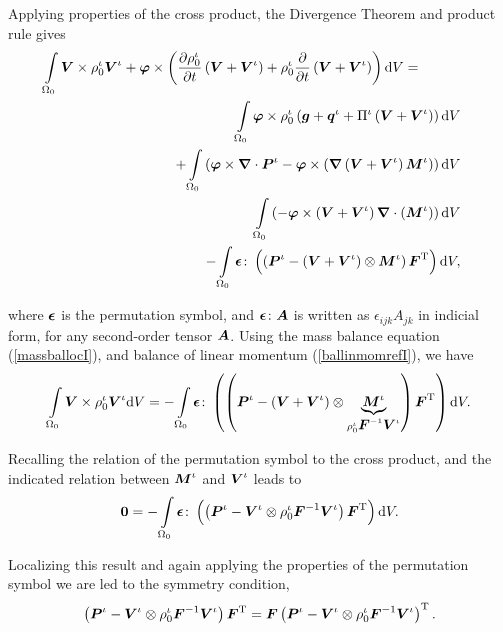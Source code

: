 \noindent Applying properties of the cross product, the Divergence
Theorem and product rule gives
\begin{eqnarray}
\int\limits_{\Omega_0}\mbox{\boldmath$ V$}\times\rho^\iota_0\mbox{\boldmath$ V$}^\iota +
\mbox{\boldmath$\varphi$}\times \left(\frac{\partial\rho^\iota_0}{\partial
t}\left(\mbox{\boldmath$ V$}+\mbox{\boldmath$ V$}^\iota\right)+ \rho^\iota_0\frac{\partial}{\partial
t}\left(\mbox{\boldmath$ V$}+\mbox{\boldmath$ V$}^\iota\right)\right)\mathrm{d}V =\qquad\quad& &\nonumber\\
\int\limits_{\Omega_0}\mbox{\boldmath$\varphi$}\times\rho^\iota_0\left(\mbox{\boldmath$ g$}+\mbox{\boldmath$ q$}^\iota+\Pi^\iota\left(\mbox{\boldmath$ V$}+\mbox{\boldmath$ V$}^\iota\right)\right)\mathrm{d}V& &\nonumber\\
 +
\int\limits_{\Omega_0}\left(\mbox{\boldmath$\varphi$}\times\mbox{\boldmath$\nabla$}\cdot\mbox{\boldmath$ P$}^\iota-\mbox{\boldmath$\varphi$}\times\left(\mbox{\boldmath$\nabla$}\left(\mbox{\boldmath$ V$}+\mbox{\boldmath$ V$}^\iota\right)\mbox{\boldmath$ M$}^\iota\right)\right)\mathrm{d}V
& &\nonumber\\
\int\limits_{\Omega_0}\left(-\mbox{\boldmath$\varphi$}\times\left(\mbox{\boldmath$ V$}+\mbox{\boldmath$ V$}^\iota\right)\mbox{\boldmath$\nabla$}\cdot\left(\mbox{\boldmath$ M$}^\iota\right)\right)
\mathrm{d}V & &\nonumber\\
-
\int\limits_{\Omega_0}\mbox{\boldmath$\epsilon$}\colon\left(\left(\mbox{\boldmath$ P$}^\iota-\left(\mbox{\boldmath$ V$}+\mbox{\boldmath$ V$}^\iota\right)\otimes\mbox{\boldmath$ M$}^\iota\right)\mbox{\boldmath$ F$}^\mathrm{T}\right)\mathrm{d}V,
\end{eqnarray}

\noindent where $\mbox{\boldmath$\epsilon$}$ is the permutation symbol, and
$\mbox{\boldmath$\epsilon$}\colon\mbox{\boldmath$ A$}$ is written as $\epsilon_{ijk}A_{jk}$ in
indicial form, for any second-order tensor $\mbox{\boldmath$ A$}$. Using the mass
balance equation (\ref{massballocI}), and balance of linear
momentum (\ref{ballinmomrefI}), we have
\begin{displaymath}
\int\limits_{\Omega_0}\mbox{\boldmath$ V$}\times\rho^\iota_0\mbox{\boldmath$ V$}^\iota\mathrm{d}V =
-\int\limits_{\Omega_0}\mbox{\boldmath$\epsilon$}\colon\left(\left(\mbox{\boldmath$ P$}^\iota-\left(\mbox{\boldmath$ V$}+\mbox{\boldmath$ V$}^\iota\right)\otimes\underbrace{\mbox{\boldmath$ M$}^\iota}_{\rho_0^\iota\mbox{\boldmath$ F$}^{-1}\mbox{\boldmath$ V$}^\iota}\right)\mbox{\boldmath$ F$}^\mathrm{T}\right)\mathrm{d}V.
\end{displaymath}

\noindent Recalling the relation of the permutation symbol to the
cross product, and the indicated relation between $\mbox{\boldmath$ M$}^\iota$ and
$\mbox{\boldmath$ V$}^\iota$ leads to
\begin{equation}
{\bf 0} =
-\int\limits_{\Omega_0}\mbox{\boldmath$\epsilon$}\colon\left(\left(\mbox{\boldmath$ P$}^\iota-\mbox{\boldmath$ V$}^\iota\otimes\rho_0^\iota\mbox{\boldmath$ F$}^{-1}\mbox{\boldmath$ V$}^\iota\right)\mbox{\boldmath$ F$}^\mathrm{T}\right)\mathrm{d}V.
\end{equation}

\noindent Localizing this result and again applying the properties
of the permutation symbol we are led to the symmetry condition,
\begin{equation}
\left(\mbox{\boldmath$ P$}^\iota-\mbox{\boldmath$ V$}^\iota\otimes\rho^\iota_0\mbox{\boldmath$ F$}^{-1}\mbox{\boldmath$ V$}^\iota\right)\mbox{\boldmath$ F$}^\mathrm{T}
=
\mbox{\boldmath$ F$}\left(\mbox{\boldmath$ P$}^\iota-\mbox{\boldmath$ V$}^\iota\otimes\rho^\iota_0\mbox{\boldmath$ F$}^{-1}\mbox{\boldmath$ V$}^\iota\right)^\mathrm{T}.
\end{equation}

